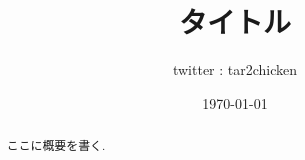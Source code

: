 \documentclass[uplatex, dvipdfmx]{jsarticle}
\title{タイトル}
\author{twitter : tar2chicken}
\date{\today}
\begin{document}
\maketitle
\begin{abstract}
    ここに概要を書く.
\end{abstract}
\tableofcontents


\end{document}
